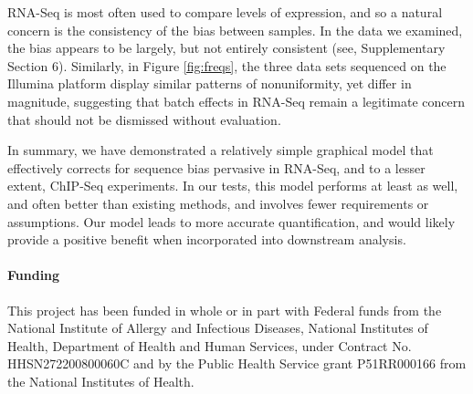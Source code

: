 \documentclass{bioinfo}
\begin{document}
RNA-Seq is most often used to compare levels of expression, and so a natural
concern is the consistency of the bias between samples. In the data we examined,
the bias appears to be largely, but not entirely consistent (see, Supplementary
Section 6).  Similarly, in Figure \ref{fig:freqs}, the three data sets sequenced
on the Illumina platform display similar patterns of nonuniformity, yet differ
in magnitude, suggesting that batch effects in RNA-Seq remain a legitimate
concern that should not be dismissed without evaluation.

In summary, we have demonstrated a relatively simple graphical model that
effectively corrects for sequence bias pervasive in RNA-Seq, and to a lesser
extent, ChIP-Seq experiments. In our tests, this model performs at least as
well, and often better than existing methods, and involves fewer requirements or
assumptions. Our model leads to more accurate quantification, and would likely
provide a positive benefit when incorporated into downstream analysis.



\paragraph{Funding\textcolon} This project has been funded in whole or in part
with Federal funds from the National Institute of Allergy and Infectious
Diseases, National Institutes of Health, Department of Health and Human Services,
under Contract No.  HHSN272200800060C and by the Public Health Service grant
P51RR000166 from the National Institutes of Health.





\end{document}
